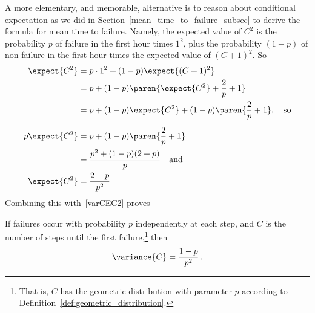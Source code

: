 A more elementary, and memorable, alternative is to reason about
conditional expectation as we did in
Section~\ref{mean_time_to_failure_subsec} to derive the formula for
mean time to failure.  Namely, the expected value of $C^2$ is the
probability $p$ of failure in the first hour times $1^2$, plus the
probability $(1-p)$ of non-failure in the first hour times the
expected value of $(C+1)^2$.  So
\begin{align*}
\expect{C^2} & = p\cdot 1^2 + (1-p)\expect{(C+1)^2}\\
             & = p + (1-p) \paren{\expect{C^2} + \frac{2}{p} +1}\\
             & = p+ (1-p)\expect{C^2} + (1-p)\paren{\frac{2}{p} + 1},
                \quad\text{so}\\[5pt]
p \expect{C^2} & = p+ (1-p)\paren{\frac{2}{p} + 1}\\
               & = \frac{p^2+(1-p)(2+p)}{p} \quad\text{and}\\
\expect{C^2} & = \frac{2 -p}{p^2} %
\end{align*}
Combining this with~\eqref{varCEC2} proves
\begin{lemma}\label{lem:var_time_to_fail}
If failures occur with probability $p$ independently at each step, and
$C$ is the number of steps until the first failure,\footnote{That is,
  $C$ has the geometric distribution with parameter $p$ according to
  Definition~\ref{def:geometric_distribution}.} then
\begin{equation}\label{var_time_to_fail}
\variance{C} = \frac{1-p}{p^2} \,.
\end{equation}
\end{lemma}

